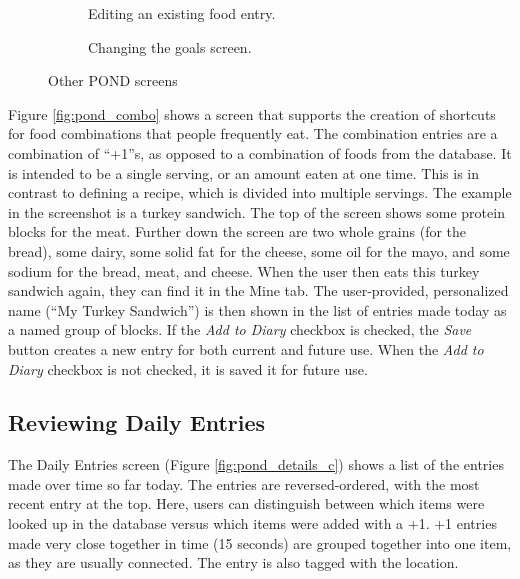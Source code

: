 \begin{figure}
\begin{subfigure}[t]{1.25in}
		\caption{Editing an existing food entry.  }\label{fig:pond_record_edit}
	\end{subfigure}
\quad
\begin{subfigure}[t]{1.25in}
		\centering
		\setlength\fboxsep{0pt}
\setlength\fboxrule{0.5pt}
		\caption{Changing the goals screen.  }\label{fig:pond_goals}
	\end{subfigure}
	\caption{Other POND screens}\label{fig:pond_details}
\end{figure}
Figure \ref{fig:pond_combo} shows a screen that supports the creation of shortcuts for food combinations that people frequently eat. The combination entries are a combination of ``+1''s, as opposed to a combination of foods from the database. It is intended to be a single serving, or an amount eaten at one time. This is in contrast to defining a recipe, which is divided into multiple servings. The example in the screenshot is a turkey sandwich. The top of the screen shows some protein blocks for the meat. Further down the screen are two whole grains (for the bread), some dairy, some solid fat for the cheese, some oil for the mayo, and some sodium for the bread, meat, and cheese. When the user then eats this turkey sandwich again, they can find it in the Mine tab. The user-provided, personalized name (``My Turkey Sandwich'') is then shown in the list of entries made today as a named group of blocks. If the \textit{Add to Diary} checkbox is checked, the \textit{Save} button creates a new entry for both current and future use. When the \textit{Add to Diary} checkbox is not checked, it is saved it for future use. 



\subsection{Reviewing Daily Entries}
The Daily Entries screen (Figure \ref{fig:pond_details_c}) shows a list of the entries made over time so far today. The entries are reversed-ordered, with the most recent entry at the top. Here, users can distinguish between which items were looked up in the database versus which items were added with a +1. +1 entries made very close together in time (15 seconds) are grouped together into one item, as they are usually connected. The entry is also tagged with the location. 

